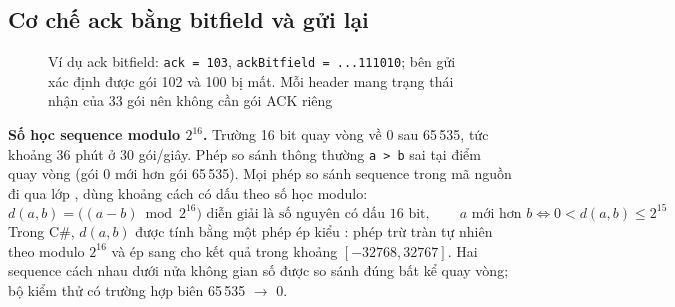 \subsection{Cơ chế ack bằng bitfield và gửi lại}
\begin{figure}[H]
\centering
{}
\caption{Ví dụ ack bitfield: \texttt{ack = 103}, \texttt{ackBitfield = ...111010}; bên gửi xác định được gói 102 và 100 bị mất.
Mỗi header mang trạng thái nhận của 33 gói nên không cần gói ACK riêng}
\label{fig:B-bitfield}
\end{figure}

\textbf{Số học sequence modulo $2^{16}$.} Trường  16 bit quay vòng về 0 sau 65\,535, tức khoảng 36 phút ở
30 gói/giây. Phép so sánh thông thường \texttt{a > b} sai tại điểm quay vòng (gói 0 mới hơn gói 65\,535). Mọi phép so
sánh sequence trong mã nguồn đi qua lớp , dùng khoảng cách có dấu theo số học modulo:
\[
  d(a,b) = \big((a - b) \bmod 2^{16}\big) \mbox{ diễn giải là số nguyên có dấu 16 bit}, \qquad
  a \mbox{ mới hơn } b \iff 0 < d(a,b) \le 2^{15}
\]
Trong C\#, $d(a,b)$ được tính bằng một phép ép kiểu : phép trừ tràn tự nhiên theo modulo $2^{16}$
và ép sang  cho kết quả trong khoảng $[-32768, 32767]$. Hai sequence cách nhau dưới nửa không gian số được
so sánh đúng bất kể quay vòng; bộ kiểm thử có trường hợp biên 65\,535 $\rightarrow$ 0.

